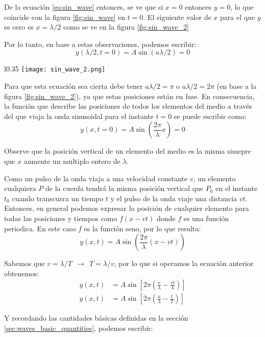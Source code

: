 De la ecuación \ref{eq:sin_wave} entonces, se ve que si \(x=0\) entonces \(y=0\), lo que coincide con la figura \ref{fig:sin_wave} en \(t=0\). El siguiente valor de \(x\) para el que \(y\) es cero es \(x=\lambda/2\) como se ve en la figura \ref{fig:sin_wave_2}

Por lo tanto, en base a estas observaciones, podemos escribir:
\[
  y(\lambda/2, t=0) = A \sin(a\lambda/2) = 0
\]
  
\begin{wrapfigure}{l}{0.35\textwidth}
  \centering
  \texttt{[image: sin\_wave\_2.png]}
  \caption{Instantánea de la cuerda en \(t=0\) donde una partícula \(P\) cualquiera tiene la misma posición vertical que \(P_0\) cuando la onda viaja una distancia \(v t\).}
  \label{fig:sin_wave_2}
\end{wrapfigure}
Para que esta ecuación sea cierta debe tener \(a\lambda/2 = \pi\) o \(a\lambda/2 = 2\pi\) (en base a la figura \ref{fig:sin_wave_2}), ya que estas posiciones están en fase. En consecuencia, la función que describe las posiciones de todos los elementos del medio a través del que viaja la onda sinusoidal para el instante \(t=0\) se puede escribir como:
\[
  y(x, t=0) = A \sin(\frac{2\pi}{\lambda} x) = 0
\]

Observe que la posición vertical de un elemento del medio es la misma simepre que \(x\) aumente un multiplo entero de \(\lambda\).

Como un pulso de la onda viaja a una velocidad constante \(v\), un elemento cualquiera \(P\) de la cuerda tendrá la misma posición vertical que \(P_0\) en el instante \(t_0\) cuando transcurra un tiempo \(t\) y el pulso de la onda viaje una distancia \(v t\). Entonces, en general podemos expresar la posición de cualquier elemento para todas las posiciones y tiempos como \(f(x - v t)\) donde \(f\) es una función periodica. En este caso \(f\) es la función seno, por lo que resulta:
\[
  y(x, t) = A \sin\left(\frac{2\pi}{\lambda} (x - v t)\right)
\]
  
Sabemos que \(v = \lambda / T ~~ \rightarrow ~~ T = \lambda/v\), por lo que si operamos la ecuación anterior obtenemos:
\begin{align*}
  y(x, t) & = A \sin\left[2\pi \left(\frac{x}{\lambda} - \frac{vt}{\lambda} \right)\right] \\
  y(x, t) & = A \sin\left[2\pi \left(\frac{x}{\lambda} - \frac{t}{T} \right)\right]
\end{align*}

Y recordando las cantidades básicas definidas en la sección \ref{sec:waves_basic_quantities}, podemos escribir:

